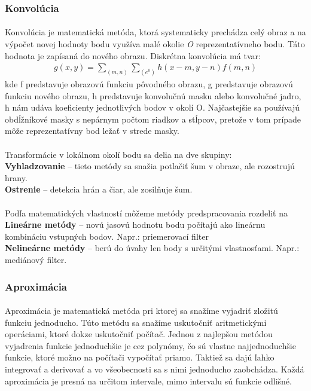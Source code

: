\documentclass[12pt]{article}
\begin{document}
\subsubsection{Konvolúcia}
\paragraph{}
Konvolúcia je matematická metóda, ktorá systematicky prechádza celý obraz a na výpočet novej hodnoty bodu využíva malé okolie \emph{O} reprezentatívneho bodu. 
Táto hodnota je zapísaná do nového obrazu. Diskrétna konvolúcia má tvar:
\begin{align*}
g(x,y) = \sum_{(m,n)} \sum_{(e^0)} h(x - m,y - n)f(m,n)
\end{align*}
kde f predstavuje obrazovú funkciu pôvodného obrazu, g predstavuje obrazovú funkciu nového obrazu, h predstavuje konvolučnú masku alebo konvolučné jadro, h nám udáva koeficienty jednotlivých bodov v okolí O.
Najčastejšie sa používajú  obdĺžníkové masky s nepárnym počtom riadkov a stĺpcov, pretože v tom prípade môže reprezentatívny bod ležať v strede masky.
\paragraph{}
Transformácie v lokálnom okolí bodu sa delia na dve skupiny: \\
\textbf{Vyhladzovanie} – tieto metódy sa snažia potlačiť šum v obraze, ale rozostrujú hrany. \\
\textbf{Ostrenie} – detekcia hrán a čiar, ale zosilňuje šum. \\
\paragraph{}
Podľa matematických vlastností môžeme metódy predspracovania rozdeliť na \\
\textbf{Lineárne metódy} – novú jasovú hodnotu bodu počítajú ako lineárnu kombináciu vstupných bodov. Napr.: priemerovací filter \\
\textbf{Nelineárne metódy} – berú do úvahy len body s určitými vlastnosťami. Napr.: mediánový filter.
\cite{DIP}
\subsubsection{Aproximácia}
\paragraph{}
Aproximácia je matematická metóda pri ktorej sa snažíme vyjadriť zložitú funkciu jednoducho. Túto metódu sa snažíme uskutočniť aritmetickými operáciami, ktoré dokze uskutočniť počítač.
Jednou z najlepšou metódou vyjadrenia funkcie jednoduchšie je cez polynómy, čo sú vlastne najjednoduchšie funkcie, ktoré možno na počítači vypočítať priamo. Taktiež sa dajú ľahko integrovať a derivovať a vo všeobecnosti sa s nimi jednoducho zaobchádza.
Každá aproximácia je presná na určitom intervale, mimo intervalu sú funkcie odlišné.
\cite{aproximacia}
\end{document}
